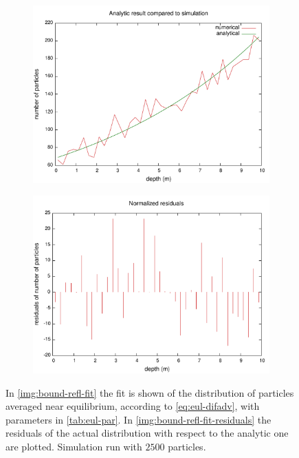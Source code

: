 \begin{figure}[!htb]
  \centering
  \begin{subfigure}[b]{0.4\textwidth}
    \includegraphics[width=1\textwidth]{data/1D_model/reflective_bottom/noflux_conditions/cfr_stoc_refl}
    \caption{}
    \label{img:bound-refl-fit}
  \end{subfigure}
  \begin{subfigure}[b]{0.4\textwidth}
    \includegraphics[width=1\textwidth]{data/1D_model/reflective_bottom/noflux_conditions/cfr_stoc_refl_residuals}
    \caption{}
    \label{img:bound-refl-fit-residuals}
  \end{subfigure}
  \caption{In \autoref{img:bound-refl-fit} the fit is shown of the distribution of particles averaged near equilibrium, according to \autoref{eq:eul-difadv}, with parameters in \autoref{tab:eul-par}. 
  In \autoref{img:bound-refl-fit-residuals} the residuals of the actual distribution with respect to the analytic one are plotted.
  Simulation run with $2500$ particles.}
\end{figure}

